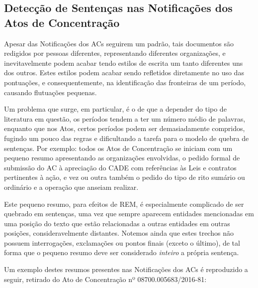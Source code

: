 \documentclass[11pt]{report}
\begin{document}
\subsection{Detecção de Sentenças nas Notificações dos Atos de Concentração}

\indent\indent Apesar das Notificações dos ACs seguirem um padrão, tais documentos são redigidos por pessoas diferentes, representando diferentes organizações, e inevitavelmente
podem acabar tendo estilos de escrita um tanto diferentes uns dos outros. Estes estilos podem acabar sendo refletidos diretamente no uso das pontuações, e consequentemente,
na identificação das fronteiras de um período, causando flutuações pequenas.

Um problema que surge, em particular, é o de que a depender do tipo de literatura em questão, os períodos tendem a ter um número médio de palavras, enquanto que
nos Atos, certos períodos podem ser demasiadamente compridos, fugindo um pouco das regras e dificultando a tarefa para o modelo de quebra de sentenças.
Por exemplo: todos os Atos de Concentração se iniciam com um pequeno resumo apresentando as organizações envolvidas, o pedido formal de submissão do AC à apreciação do CADE
com referências às Leis e contratos pertinentes à ação, e vez ou outra também o pedido do tipo de rito sumário ou ordinário e a operação que anseiam realizar.

Este pequeno resumo, para efeitos de REM, é especialmente complicado de ser quebrado em sentenças, uma vez que sempre aparecem entidades mencionadas
em uma posição do texto que estão relacionadas a outras entidades em outras posições, consideravelmente distantes. Notemos ainda que estes trechos não possuem interrogações, exclamações ou pontos finais (exceto o último), de tal forma que o pequeno resumo deve ser considerado \textit{inteiro} a própria sentença.

Um exemplo destes resumos presentes nas Notificações dos ACs é reproduzido a seguir, retirado do Ato de Concentração nº 08700.005683/2016-81:
\end{document}
